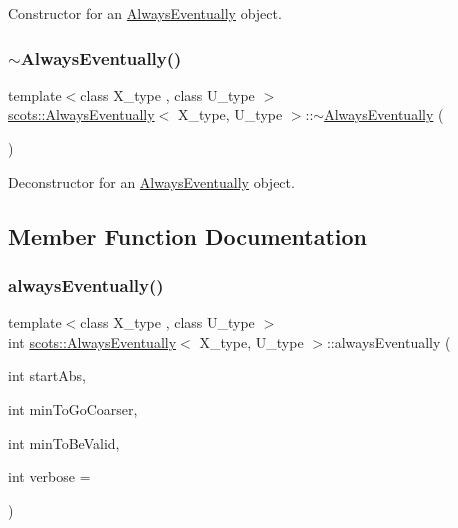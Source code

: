 Constructor for an \hyperlink{classscots_1_1AlwaysEventually}{Always\+Eventually} object. \mbox{\label{classscots_1_1AlwaysEventually_aa3d060f750bf82b5a41afdf7d925c3bb}} 
\subsubsection{\texorpdfstring{$\sim$\+Always\+Eventually()}{~AlwaysEventually()}}
{\footnotesize\ttfamily template$<$class X\+\_\+type , class U\+\_\+type $>$ \\
\hyperlink{classscots_1_1AlwaysEventually}{scots\+::\+Always\+Eventually}$<$ X\+\_\+type, U\+\_\+type $>$\+::$\sim$\hyperlink{classscots_1_1AlwaysEventually}{Always\+Eventually} (\begin{DoxyParamCaption}{ }\end{DoxyParamCaption})\hspace{0.3cm}{\ttfamily [inline]}}

Deconstructor for an \hyperlink{classscots_1_1AlwaysEventually}{Always\+Eventually} object. 

\subsection{Member Function Documentation}
\mbox{\label{classscots_1_1AlwaysEventually_a2428c979a09a3aa7efeed53059098bbc}} 
\subsubsection{\texorpdfstring{always\+Eventually()}{alwaysEventually()}}
{\footnotesize\ttfamily template$<$class X\+\_\+type , class U\+\_\+type $>$ \\
int \hyperlink{classscots_1_1AlwaysEventually}{scots\+::\+Always\+Eventually}$<$ X\+\_\+type, U\+\_\+type $>$\+::always\+Eventually (\begin{DoxyParamCaption}\item[{int}]{start\+Abs,  }\item[{int}]{min\+To\+Go\+Coarser,  }\item[{int}]{min\+To\+Be\+Valid,  }\item[{int}]{verbose = {} }\end{DoxyParamCaption})\hspace{0.3cm}{\ttfamily [inline]}}

